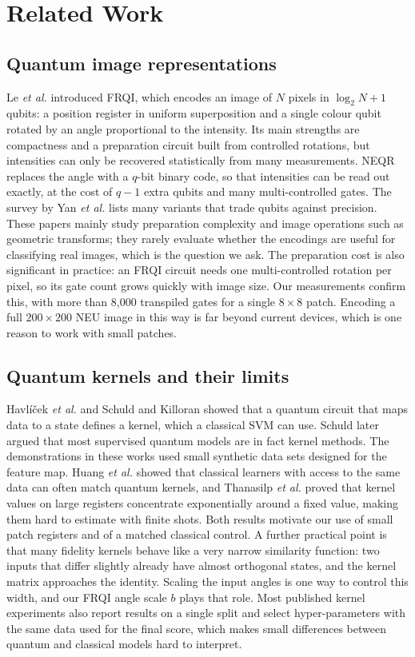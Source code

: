 \documentclass[12pt,onecolumn,draftclsnofoot]{IEEEtran}
\begin{document}
\section{Related Work}
\subsection{Quantum image representations}
Le \emph{et al.} \cite{le2011frqi} introduced FRQI, which encodes an image of $N$ pixels in $\log_2 N+1$ qubits: a position register in uniform superposition and a single colour qubit rotated by an angle proportional to the intensity. Its main strengths are compactness and a preparation circuit built from controlled rotations, but intensities can only be recovered statistically from many measurements. NEQR \cite{zhang2013neqr} replaces the angle with a $q$-bit binary code, so that intensities can be read out exactly, at the cost of $q-1$ extra qubits and many multi-controlled gates. The survey by Yan \emph{et al.} \cite{yan2016survey} lists many variants that trade qubits against precision. These papers mainly study preparation complexity and image operations such as geometric transforms; they rarely evaluate whether the encodings are useful for classifying real images, which is the question we ask. The preparation cost is also significant in practice: an FRQI circuit needs one multi-controlled rotation per pixel, so its gate count grows quickly with image size. Our measurements confirm this, with more than 8,000 transpiled gates for a single $8\times8$ patch. Encoding a full $200\times200$ NEU image in this way is far beyond current devices, which is one reason to work with small patches.

\subsection{Quantum kernels and their limits}
Havl\'{i}\v{c}ek \emph{et al.} \cite{havlicek2019} and Schuld and Killoran \cite{schuld2019feature} showed that a quantum circuit that maps data to a state defines a kernel, which a classical SVM can use. Schuld \cite{schuld2021kernel} later argued that most supervised quantum models are in fact kernel methods. The demonstrations in these works used small synthetic data sets designed for the feature map. Huang \emph{et al.} \cite{huang2021power} showed that classical learners with access to the same data can often match quantum kernels, and Thanasilp \emph{et al.} \cite{thanasilp2024} proved that kernel values on large registers concentrate exponentially around a fixed value, making them hard to estimate with finite shots. Both results motivate our use of small patch registers and of a matched classical control. A further practical point is that many fidelity kernels behave like a very narrow similarity function: two inputs that differ slightly already have almost orthogonal states, and the kernel matrix approaches the identity. Scaling the input angles is one way to control this width, and our FRQI angle scale $b$ plays that role. Most published kernel experiments also report results on a single split and select hyper-parameters with the same data used for the final score, which makes small differences between quantum and classical models hard to interpret.
\end{document}
